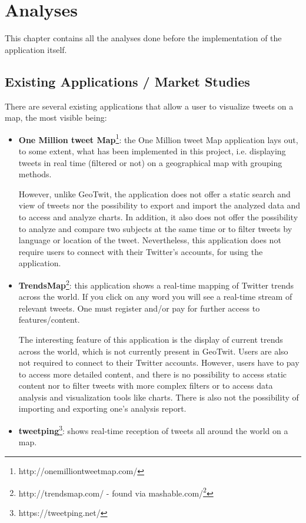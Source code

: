\documentclass[a4paper,11pt]{report}
\begin{document}
\chapter{Analyses}
This chapter contains all the analyses done before the implementation of the application itself.

\section{Existing Applications / Market Studies}
There are several existing applications that allow a user to visualize tweets on a map, the most visible being:
\begin{itemize}
	\item \textbf{One Million tweet Map}\footnote{http://onemilliontweetmap.com/}: the One Million tweet Map application lays out, to some extent, what has been implemented in this project, i.e. displaying tweets in real time (filtered or not) on a geographical map with grouping methods.
	
	However, unlike GeoTwit, the application does not offer a static search and view of tweets nor the possibility to export and import the analyzed data and to access and analyze charts. In addition, it also does not offer the possibility to analyze and compare two subjects at the same time or to filter tweets by language or location of the tweet. Nevertheless, this application does not require users to connect with their Twitter's accounts, for using the application.
	\item \textbf{TrendsMap}\footnote{http://trendsmap.com/ - found via mashable.com/\footnote{http://mashable.com/2010/08/06/twitter-mapping-tools/\#yrksT7cG8Sqg}}: this application shows a real-time mapping of Twitter trends across the world. If you click on any word you will see a real-time stream of relevant tweets. One must register and/or pay for further access to features/content.
	
	The interesting feature of this application is the display of current trends across the world, which is not currently present in GeoTwit. Users are also not required to connect to their Twitter accounts. However, users have to pay to access more detailed content, and there is no possibility to access static content nor to filter tweets with more complex filters or to access data analysis and visualization tools like charts. There is also not the possibility of importing and exporting one's analysis report.
	\newpage
	
	\item \textbf{tweetping}\footnote{https://tweetping.net/}: shows real-time reception of tweets all around the world on a map.
	

\end{itemize}
\end{document}
